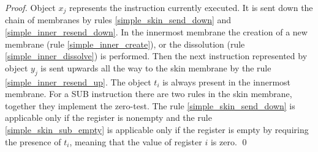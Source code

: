 \documentclass[submission,copyright,creativecommons]{../lib/lncs/llncs}
\begin{document}
\begin{proof}
  Object $x_j$ represents the instruction currently executed. It is sent down the chain of membranes by rules \ref{simple_skin_send_down} and \ref{simple_inner_resend_down}. In the innermost membrane the creation of a new membrane (rule \ref{simple_inner_create}), or the dissolution (rule \ref{simple_inner_dissolve}) is performed. Then the next instruction represented by object $y_j$ is sent upwards all the way to the skin membrane by the rule \ref{simple_inner_resend_up}. The object $t_i$ is always present in the innermost membrane. For a SUB instruction there are two rules in the skin membrane, together they implement the zero-test. The rule \ref{simple_skin_send_down} is applicable only if the register is nonempty and the rule \ref{simple_skin_sub_empty} is applicable only if the register is empty by requiring the presence of $t_i$, meaning that the value of register $i$ is zero. \qed
\end{proof}
\end{document}
